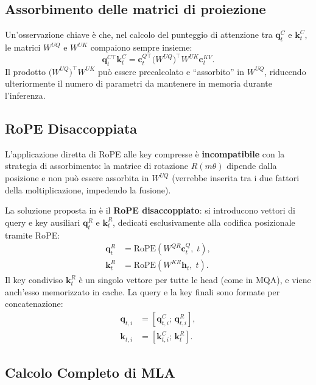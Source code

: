 \subsection{Assorbimento delle matrici di proiezione}
\label{subsec:mla-absorption}

Un'osservazione chiave è che, nel calcolo del punteggio di attenzione tra
$\mathbf{q}_t^C$ e $\mathbf{k}_t^C$, le matrici $W^{UQ}$ e $W^{UK}$
compaiono sempre insieme:
\begin{equation}
  \mathbf{q}_t^{C\top} \mathbf{k}_t^C
  = \mathbf{c}_t^{Q\top}\bigl(W^{UQ}\bigr)^\top W^{UK} \mathbf{c}_t^{KV}.
\end{equation}
Il prodotto $\bigl(W^{UQ}\bigr)^\top W^{UK}$ può essere precalcolato e
``assorbito'' in $W^{UQ}$, riducendo ulteriormente il numero di parametri
da mantenere in memoria durante l'inferenza.

\subsection{RoPE Disaccoppiata}
\label{subsec:decoupled-rope}

L'applicazione diretta di RoPE alle key compresse è \textbf{incompatibile}
con la strategia di assorbimento: la matrice di rotazione $R(m\theta)$
dipende dalla posizione e non può essere assorbita in $W^{UQ}$ (verrebbe
inserita tra i due fattori della moltiplicazione, impedendo la fusione).

La soluzione proposta in \citet{deepseekv2_2024} è il \textbf{RoPE
disaccoppiato}: si introducono vettori di query e key ausiliari
$\mathbf{q}_t^R$ e $\mathbf{k}_t^R$, dedicati esclusivamente alla
codifica posizionale tramite RoPE:
\begin{align}
  \mathbf{q}_t^R &= \text{RoPE}(W^{QR} \mathbf{c}_t^Q, \; t), \\
  \mathbf{k}_t^R &= \text{RoPE}(W^{KR} \mathbf{h}_t, \; t).
\end{align}
Il key condiviso $\mathbf{k}_t^R$ è un singolo vettore per tutte le head
(come in MQA), e viene anch'esso memorizzato in cache. La query e la key
finali sono formate per concatenazione:
\begin{align}
  \mathbf{q}_{t,i} &= [\mathbf{q}_{t,i}^C;\, \mathbf{q}_{t,i}^R], \\
  \mathbf{k}_{t,i} &= [\mathbf{k}_{t,i}^C;\, \mathbf{k}_t^R].
\end{align}

\subsection{Calcolo Completo di MLA}
\label{subsec:mla-computation}

